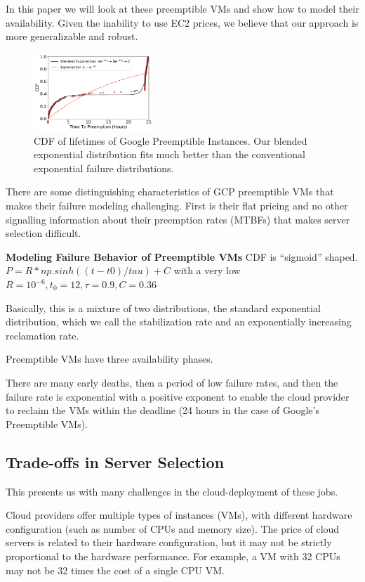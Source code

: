 In this paper we will look at these preemptible VMs and show how to model their availability.
Given the inability to use EC2 prices, we believe that our approach is more generalizable and robust.

\begin{figure}
  \centering
  \includegraphics[width=0.4\textwidth]{../data/cdf_all.pdf}
  \caption{CDF of lifetimes of Google Preemptible Instances. Our blended exponential distribution fits much better than the conventional exponential failure distributions. }
  \label{fig:gcp1}
\end{figure}

There are some distinguishing characteristics of GCP preemptible VMs that makes their failure modeling challenging.
First is their flat pricing and no other signalling information about their preemption rates (MTBFs) that makes server selection difficult.

\textbf{Modeling Failure Behavior of Preemptible VMs}
CDF is ``sigmoid'' shaped.
$P=R*np.sinh((t-t0)/tau) + C$ with a very low $R=10^{-6}, t_0=12, \tau=0.9, C=0.36$

Basically, this is a mixture of two distributions, the standard exponential distribution, which we call the stabilization rate and an exponentially increasing reclamation rate.

Preemptible VMs have three availability phases.

There are many early deaths, then a period of low failure rates, and then the failure rate is exponential with a positive exponent to enable the cloud provider to reclaim the VMs within the deadline (24 hours in the case of Google's Preemptible VMs).



\subsection{Trade-offs in Server Selection}

This presents us with many challenges in the cloud-deployment of these jobs.

Cloud providers offer multiple types of instances (VMs), with different hardware configuration (such as number of CPUs and memory size).
The price of cloud servers is related to their hardware configuration, but it may not be strictly proportional to the hardware performance.
For example, a VM with 32 CPUs may not be 32 times the cost of a single CPU VM.



